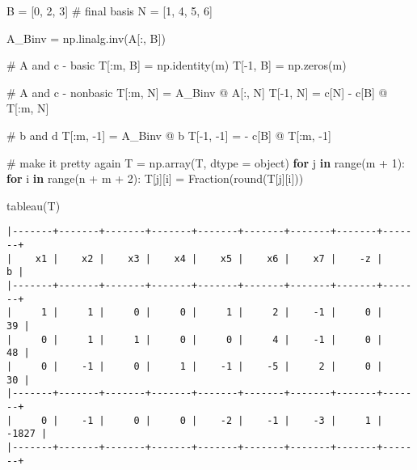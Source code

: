\documentclass[
  letterpaper,
  DIV=11,
  numbers=noendperiod]{scrartcl}
\newenvironment{Shaded}{\begin{snugshade}}{\end{snugshade}}
\newcommand{\BuiltInTok}[1]{\textcolor[rgb]{0.00,0.23,0.31}{#1}}
\newcommand{\CommentTok}[1]{\textcolor[rgb]{0.37,0.37,0.37}{#1}}
\newcommand{\ControlFlowTok}[1]{\textcolor[rgb]{0.00,0.23,0.31}{\textbf{#1}}}
\newcommand{\DecValTok}[1]{\textcolor[rgb]{0.68,0.00,0.00}{#1}}
\newcommand{\KeywordTok}[1]{\textcolor[rgb]{0.00,0.23,0.31}{\textbf{#1}}}
\newcommand{\NormalTok}[1]{\textcolor[rgb]{0.00,0.23,0.31}{#1}}
\newcommand{\OperatorTok}[1]{\textcolor[rgb]{0.37,0.37,0.37}{#1}}
\begin{document}
\begin{Shaded}
\begin{Highlighting}[]
\NormalTok{B }\OperatorTok{=}\NormalTok{ [}\DecValTok{0}\NormalTok{, }\DecValTok{2}\NormalTok{, }\DecValTok{3}\NormalTok{] }\CommentTok{\# final basis}
\NormalTok{N }\OperatorTok{=}\NormalTok{ [}\DecValTok{1}\NormalTok{, }\DecValTok{4}\NormalTok{, }\DecValTok{5}\NormalTok{, }\DecValTok{6}\NormalTok{]}

\NormalTok{A\_Binv }\OperatorTok{=}\NormalTok{ np.linalg.inv(A[:, B])}

\CommentTok{\# A and c {-} basic}
\NormalTok{T[:m, B] }\OperatorTok{=}\NormalTok{ np.identity(m)}
\NormalTok{T[}\OperatorTok{{-}}\DecValTok{1}\NormalTok{, B] }\OperatorTok{=}\NormalTok{ np.zeros(m)}

\CommentTok{\# A and c {-} nonbasic}
\NormalTok{T[:m, N] }\OperatorTok{=}\NormalTok{ A\_Binv }\OperatorTok{@}\NormalTok{ A[:, N]}
\NormalTok{T[}\OperatorTok{{-}}\DecValTok{1}\NormalTok{, N] }\OperatorTok{=}\NormalTok{ c[N] }\OperatorTok{{-}}\NormalTok{ c[B] }\OperatorTok{@}\NormalTok{ T[:m, N]}

\CommentTok{\# b and d}
\NormalTok{T[:m, }\OperatorTok{{-}}\DecValTok{1}\NormalTok{] }\OperatorTok{=}\NormalTok{ A\_Binv }\OperatorTok{@}\NormalTok{ b}
\NormalTok{T[}\OperatorTok{{-}}\DecValTok{1}\NormalTok{, }\OperatorTok{{-}}\DecValTok{1}\NormalTok{] }\OperatorTok{=} \OperatorTok{{-}}\NormalTok{ c[B] }\OperatorTok{@}\NormalTok{ T[:m, }\OperatorTok{{-}}\DecValTok{1}\NormalTok{]}

\CommentTok{\# make it pretty again}
\NormalTok{T }\OperatorTok{=}\NormalTok{ np.array(T, dtype }\OperatorTok{=} \BuiltInTok{object}\NormalTok{)}
\ControlFlowTok{for}\NormalTok{ j }\KeywordTok{in} \BuiltInTok{range}\NormalTok{(m }\OperatorTok{+} \DecValTok{1}\NormalTok{):}
    \ControlFlowTok{for}\NormalTok{ i }\KeywordTok{in} \BuiltInTok{range}\NormalTok{(n }\OperatorTok{+}\NormalTok{ m }\OperatorTok{+} \DecValTok{2}\NormalTok{):}
\NormalTok{        T[j][i] }\OperatorTok{=}\NormalTok{ Fraction(}\BuiltInTok{round}\NormalTok{(T[j][i]))}

\NormalTok{tableau(T)}
\end{Highlighting}
\end{Shaded}

\begin{verbatim}
|-------+-------+-------+-------+-------+-------+-------+-------+-------+
|    x1 |    x2 |    x3 |    x4 |    x5 |    x6 |    x7 |    -z |     b |
|-------+-------+-------+-------+-------+-------+-------+-------+-------+
|     1 |     1 |     0 |     0 |     1 |     2 |    -1 |     0 |    39 |
|     0 |     1 |     1 |     0 |     0 |     4 |    -1 |     0 |    48 |
|     0 |    -1 |     0 |     1 |    -1 |    -5 |     2 |     0 |    30 |
|-------+-------+-------+-------+-------+-------+-------+-------+-------+
|     0 |    -1 |     0 |     0 |    -2 |    -1 |    -3 |     1 | -1827 |
|-------+-------+-------+-------+-------+-------+-------+-------+-------+
\end{verbatim}
\end{document}
